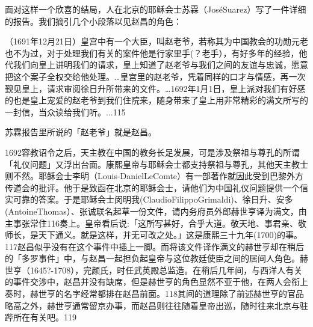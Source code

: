 面对这样一个欣喜的结局，人在北京的耶稣会士苏霖（JoséSuarez）写了一件详细的报告。我们摘引几个小段落以见赵昌的角色：

\begin{BookQuote}
（1691年12月21日）皇宫中有一个大臣，叫赵老爷，若称其为中国教会的功勋元老也不为过，对于处理我们有关的案件他是行家里手(？老手），有好多年的经验，他代我们向皇上讲明我们的请求，皇上知道了赵老爷与我们之间的友谊与忠诚，愿意把这个案子全权交给他处理。…皇宫里的赵老爷，凭着同样的口才与情感，再一次觐见皇上，请求审阅徐日升所带来的文件。…1692年1月1日，皇上派对我们有好感的也是皇上宠爱的赵老爷到我们住院来，随身带来了皇上用非常精彩的满文所写的一封信，当众读给我们听。...115
\end{BookQuote}

\vfill
\begin{BookNotes}
\end{BookNotes}

\noindent 苏霖报告里所说的「赵老爷」就是赵昌。

1692容教诏令之后，天主教在中国的教务长足发展，可是涉及祭祖与尊孔的所谓「礼仪问题」又浮出台面。康熙皇帝与耶稣会士都支持祭祖与尊孔，其他天主教士则不然。耶稣会士李明（Louis-DanielLeComte）有一部著作就因此受到巴黎外方传道会的批评。他于是致函在北京的耶稣会士，请他们为中国礼仪问题提供一个信实可靠的答案。于是耶稣会士闵明我(ClaudioFilippoGrimaldi)、徐日升、安多(AntoineThomas）、张诚联名起草一份文件，请内务府员外郎赫世亨译为满文，由主事张常住116奏上。皇帝看后说:「这所写甚好，合乎大道。敬天地、事君亲、敬师长，是天下通义。就是这样，并无可改之处。」这是康熙三十九年(1700)的事。117赵昌似乎没有在这个事件中插上一脚。而将该文件译作满文的赫世亨却在稍后的「多罗事件」中，与赵昌一起担负起皇帝与这位教廷使臣之间的居间人角色。赫世亨（1645?-1708），完颜氏，时任武英殿总监造。在稍后几年间，与西洋人有关的事件交涉中，赵昌并没有缺席，但是赫世亨的角色显然不亚于他，在两人会衔上奏时，赫世亨的名字经常都排在赵昌前面。118其间的道理除了前述赫世亨的官品略高之外，赫世亨通常留京办事，而赵昌则往往随着皇帝出巡，随时往来北京与驻跸所在有关吧。119

